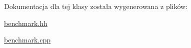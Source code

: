 Dokumentacja dla tej klasy została wygenerowana z plików\-:\begin{DoxyCompactItemize}
\item 
\hyperlink{benchmark_8hh}{benchmark.\-hh}\item 
\hyperlink{benchmark_8cpp}{benchmark.\-cpp}\end{DoxyCompactItemize}
